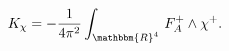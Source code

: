 \begin{equation}\label{eq:cs-1}
 K_\chi=-\frac{1}{4\pi^2}\int_{\mathbbm{R}^4}\,F^+_A\wedge\chi^+.
\end{equation}

